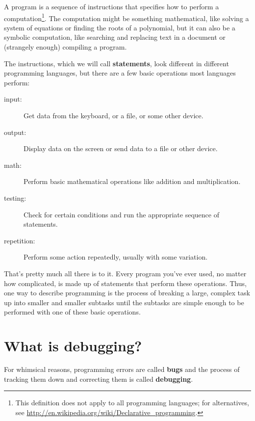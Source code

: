 \documentclass[12pt]{book}
\theoremstyle{exercise}
\begin{document}
A program is a sequence of instructions that specifies how to perform
a computation\footnote{This definition does not apply to all
  programming languages; for alternatives, see
  \url{http://en.wikipedia.org/wiki/Declarative_programming}.}.  The
computation might be something mathematical, like solving a system of
equations or finding the roots of a polynomial, but it can also be a
symbolic computation, like searching and replacing text in a document
or (strangely enough) compiling a program.


The instructions, which we will call {\bf statements}, look different
in different programming languages, but there are a few basic
operations most languages perform:

\begin{description}

\item[input:] Get data from the keyboard, or a file, or some
other device.

\item[output:] Display data on the screen or send data to a
file or other device.

\item[math:] Perform basic mathematical operations like addition and
multiplication.

\item[testing:] Check for certain conditions and run the
appropriate sequence of statements.

\item[repetition:] Perform some action repeatedly, usually with
some variation.

\end{description}

That's pretty much all there is to it.
Every program you've ever used, no matter how complicated, is
made up of statements that perform these operations.  Thus,
one way to describe programming is the process of breaking a
large, complex task up into smaller and smaller subtasks
until the subtasks are simple enough to be performed
with one of these basic operations.


\section{What is debugging?}

For whimsical reasons,
programming errors are called {\bf bugs} and the process
of tracking them down and correcting them is called
{\bf debugging}.
\end{document}
